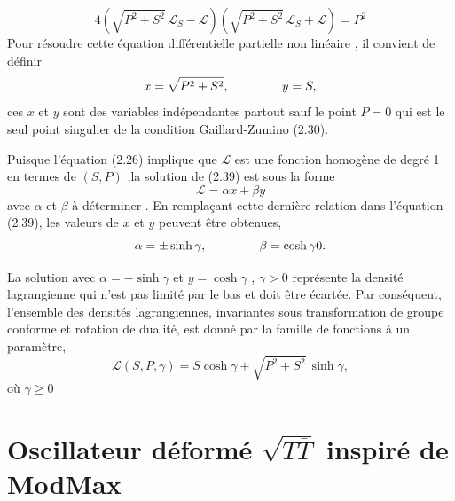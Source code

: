 \documentclass[12pt,a4paper, openany]{report}
\begin{document}
	\begin{equation}
		4\left(\sqrt{P^2+ S^2}\,\mathcal{L}_S-\mathcal{L}\right)\left(\sqrt{P^2+ S^2}\,\mathcal{L}_S+\mathcal{L}\right)=P^2
	\end{equation}
	Pour résoudre cette équation différentielle partielle non linéaire , il convient de définir 
	\begin{equation}
		x=\sqrt{P^2+ S^2} , \hspace{1.5cm} y=S ,
	\end{equation}
	ces $x$ et $y$ sont des variables indépendantes partout sauf le point $P=0$ qui est le seul point singulier de la condition Gaillard-Zumino (2.30).\par Puisque l'équation (2.26) implique que $\mathcal{L}$ est une fonction homogène de degré 1 en termes de $(S,P)$ ,la solution de (2.39) est sous la forme 
	\begin{equation}
		\mathcal{L}=\alpha x +\beta y	
	\end{equation}
	avec $\alpha$ et $\beta$ à déterminer . En remplaçant cette dernière relation dans l'équation (2.39), les valeurs de $x$ et $y$ peuvent \^{e}tre obtenues,
	\begin{equation}
		\alpha=\pm \sinh{\gamma} , \hspace{1.5cm} \beta=\cosh{\gamma} 0.
	\end{equation} 
	
	La solution avec $\alpha=-\sinh{\gamma}$ et $y=\cosh{\gamma}$ , $\gamma>0$ représente la densité lagrangienne qui n'est pas limité par le bas et doit \^{e}tre écartée. Par conséquent, l'ensemble des densités lagrangiennes, invariantes sous transformation de groupe conforme et rotation de dualité, est donné par la famille de fonctions à un paramètre,
	\begin{equation}
		\mathcal{L}(S,P, \gamma)=S \cosh{\gamma}+\sqrt{P^2+ S^2}\, \sinh{\gamma},
	\end{equation}
	où $\gamma\geq 0$
	
	
	
	\chapter{ Oscillateur déformé  $\sqrt{T{\overline{T}}}$ inspiré de ModMax} 
\end{document}
